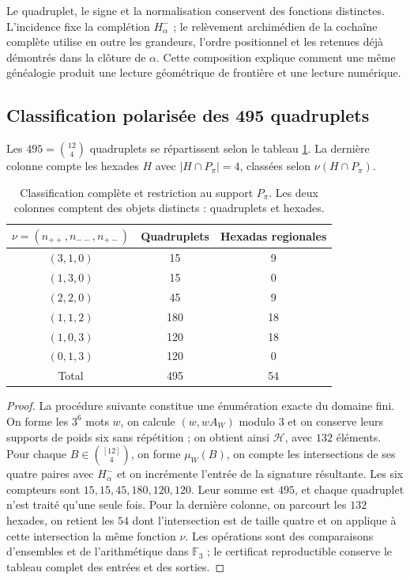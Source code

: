 Le quadruplet, le signe et la normalisation conservent des fonctions distinctes. L'incidence fixe la complétion \(H^-_\alpha\) ; le relèvement archimédien de la cochaîne complète utilise en outre les grandeurs, l'ordre positionnel et les retenues déjà démontrés dans la clôture de \(\alpha\). Cette composition explique comment une même généalogie produit une lecture géométrique de frontière et une lecture numérique.

\subsection{Classification polarisée des 495 quadruplets}
\label{star27:clasificacion}

\begin{theorem}
\label{star27:censo}
Les \(495=\binom{12}{4}\) quadruplets se répartissent selon le tableau
\ref{star27:tabla-censo}. La dernière colonne compte les hexades
\(H\) avec \(|H\cap P_\pi|=4\), classées selon
\(\nu(H\cap P_\pi)\).
\end{theorem}

\begin{table}[htbp]
\centering
\begin{tabular}{ccc}
\toprule
\(\nu=(n_{++},n_{--},n_{+-})\)&Quadruplets&Hexadas regionales\\
\midrule
\((3,1,0)\)&15&9\\
\((1,3,0)\)&15&0\\
\((2,2,0)\)&45&9\\
\((1,1,2)\)&180&18\\
\((1,0,3)\)&120&18\\
\((0,1,3)\)&120&0\\
\midrule
Total&495&54\\
\bottomrule
\end{tabular}
\caption{Classification complète et restriction au support \(P_\pi\).
Les deux colonnes comptent des objets distincts : quadruplets et hexades.}
\label{star27:tabla-censo}
\end{table}

\begin{proof}
La procédure suivante constitue une énumération exacte du domaine fini. On forme les \(3^6\) mots \(w\), on calcule \((w,wA_W)\) modulo \(3\) et on conserve leurs supports de poids six sans répétition ; on obtient ainsi \(\mathcal H\), avec \(132\) éléments. Pour chaque \(B\in\binom{[12]}4\), on forme \(\mu_W(B)\), on compte les intersections de ses quatre paires avec \(H^-_\alpha\) et on incrémente l'entrée de la signature résultante. Les six compteurs sont \(15,15,45,180,120,120\). Leur somme est \(495\), et chaque quadruplet n'est traité qu'une seule fois. Pour la dernière colonne, on parcourt les \(132\) hexades, on retient les \(54\) dont l'intersection est de taille quatre et on applique à cette intersection la même fonction \(\nu\). Les opérations sont des comparaisons d'ensembles et de l'arithmétique dans \(\mathbb F_3\) ; le certificat reproductible conserve le tableau complet des entrées et des sorties.
\end{proof}

